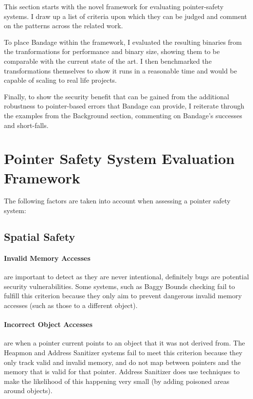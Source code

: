 \newcommand*\rot{\rotatebox{90}}
\newcommand{\xmark}{\ding{55}}

This section starts with the novel framework for evaluating pointer-safety systems.
I draw up a list of criteria upon which they can be judged and comment on the patterns across the related work.

To place Bandage within the framework, I evaluated the resulting binaries from the tranformations for performance and binary size, showing them to be comparable with the current state of the art.
I then benchmarked the transformations themselves to show it runs in a reasonable time and would be capable of scaling to real life projects.

Finally, to show the security benefit that can be gained from the additional robustness to pointer-based errors that Bandage can provide, I reiterate through the examples from the Background section, commenting on Bandage's successes and short-falls.

\section{Pointer Safety System Evaluation Framework}

The following factors are taken into account when assessing a pointer safety system:

\subsection{Spatial Safety}

\paragraph{Invalid Memory Accesses} are important to detect as they are never intentional, definitely bugs are potential security vulnerabilities.
Some systems, such as Baggy Bounds checking fail to fulfill this criterion because they only aim to prevent dangerous invalid memory accesses (such as those to a different object).

\paragraph{Incorrect Object Accesses} are when a pointer current points to an object that it was not derived from.
The Heapmon and Address Sanitizer systems fail to meet this criterion because they only track valid and invalid memory, and do not map between pointers and the memory that is valid for that pointer.
Address Sanitizer does use techniques to make the likelihood of this happening very small (by adding poisoned areas around objects).

